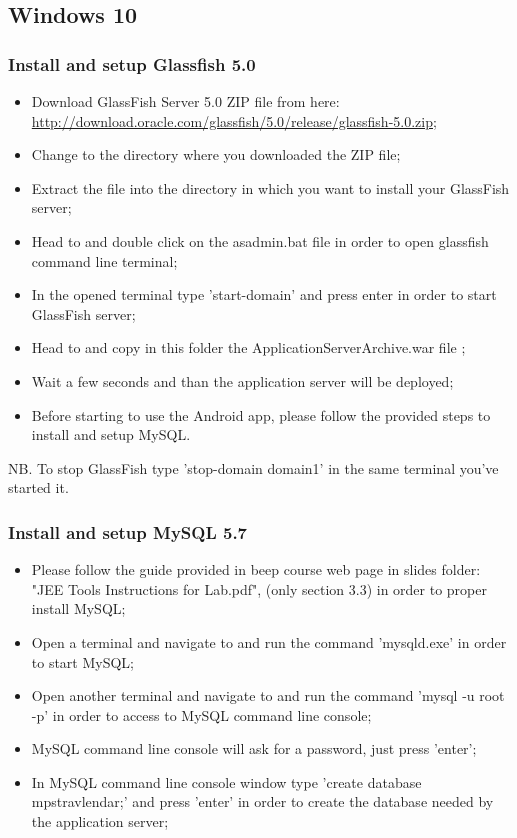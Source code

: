 \subsection{Windows 10}
\label{subsect:Windows 10}

\subsubsection{Install and setup Glassfish 5.0}
\begin{itemize}
	\item Download GlassFish Server 5.0 ZIP file from here: \\ \href{http://download.oracle.com/glassfish/5.0/release/glassfish-5.0.zip}{\color{blue}http://download.oracle.com/glassfish/5.0/release/glassfish-5.0.zip};
	\item Change to the directory where you downloaded the ZIP file;
	\item Extract the file into the directory in which you want to install your GlassFish server;
	\item Head to  and double click on the asadmin.bat file in order to open glassfish command line terminal;
	\item In the opened terminal type 'start-domain' and press enter in order to start GlassFish server;
	\item Head to  and copy in this folder the ApplicationServerArchive.war file ;
	\item Wait a few seconds and than the application server will be deployed;
	\item Before starting to use the Android app, please follow the provided steps to install and setup MySQL.
\end{itemize} 
NB. To stop GlassFish type 'stop-domain domain1' in the same terminal you've started it.

\subsubsection{Install and setup MySQL 5.7}
\begin{itemize}
	\item Please follow the guide provided in beep course web page in slides folder: "JEE Tools Instructions for Lab.pdf", (only section 3.3) in order to proper install MySQL;
	\item Open a terminal and navigate to  and run the command 'mysqld.exe' in order to start MySQL;
	\item Open another terminal and navigate to  and run the command 'mysql -u root -p' in order to access to MySQL command line console;
	\item MySQL command line console will ask for a password, just press 'enter';
	\item In MySQL command line console window type 'create database mps\textunderscore travlendar;' and press 'enter' in order to create the database needed by the application server;
\end{itemize}
	
